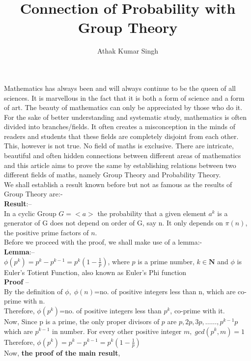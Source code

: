 \documentclass{article}
\title{Connection of Probability with Group Theory}
\author{Athak Kumar Singh }
\begin{document}
\maketitle
Mathematics has always been and will always continue to be the queen of all sciences. It is marvellous in the fact that it is both a form of science and a form of art. The beauty of mathematics can only be appreciated by those who do it.\\
\bigbreak
For the sake of better understanding and systematic study, mathematics is often divided into branches/fields. It often creates a misconception in the minds of readers and students that these fields are completely disjoint from each other. This, however is not true. No field of maths is exclusive. There are intricate, beautiful and often hidden connections between different areas of mathematics and this article aims to prove the same by establishing relations between two different fields of maths, namely Group Theory and Probability Theory.\\
\bigbreak
We shall establish a result known before but not as famous as the results of Group Theory are:-\\
  \noindent \textbf{Result}:–\\
   In a cyclic Group $G=<a>$ the probability that a given element $a^k$ is a generator of G does not depend on order of G, say n. It only depends on $\pi (n)$, the positive prime factors of $n$.\\
Before we proceed with the proof, we shall make use of a lemma:-\\
\textbf{Lemma}:–\\
$\phi (p^k)=p^k-p^{k-1}=p^k(1-\frac{1}{p})$, where $p$ is a prime number, $k \in \mathbf{N}$ and $\phi$ is Euler’s Totient Function, also known as Euler’s Phi function\\
\textbf{Proof} –\\
By the definition of $\phi ,\; \phi (n)$=no. of positive integers less than n, which are co-prime with n.\\
Therefore, $\phi (p^k)$=no. of positive integers less than $p^k$, co-prime with it.\\
Now, Since p is a prime, the only proper divisors of $p$ are $p,2p,3p,……,p^{k-1}p$ which are $p^{k-1}$ in number. For every other positive integer $m,\; gcd(p^k,m)=1$\\
Therefore, $\phi (p^k)=p^k-p^{k-1} = p^k(1-\frac{1}{p})$\\
Now, \textbf{the proof of the main result},\\ 
\end{document}
